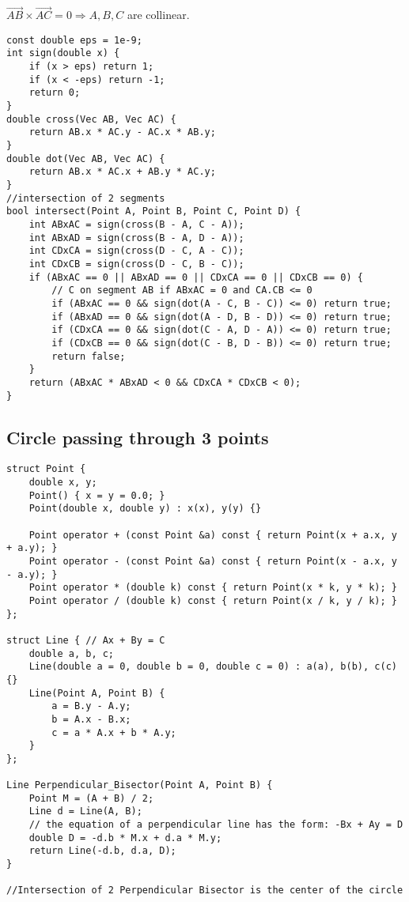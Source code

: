 \documentclass[11pt,a4paper]{article}
\begin{document}
\begin{multicols*}{2}
$\vec{AB} \times \vec{AC} = 0 \Rightarrow  A, B, C$ are collinear.

\begin{lstlisting}
const double eps = 1e-9;
int sign(double x) {
    if (x > eps) return 1;
    if (x < -eps) return -1;
    return 0;
}
double cross(Vec AB, Vec AC) {
    return AB.x * AC.y - AC.x * AB.y;
}
double dot(Vec AB, Vec AC) {
    return AB.x * AC.x + AB.y * AC.y;
}
//intersection of 2 segments
bool intersect(Point A, Point B, Point C, Point D) {
    int ABxAC = sign(cross(B - A, C - A));
    int ABxAD = sign(cross(B - A, D - A));
    int CDxCA = sign(cross(D - C, A - C));
    int CDxCB = sign(cross(D - C, B - C));
    if (ABxAC == 0 || ABxAD == 0 || CDxCA == 0 || CDxCB == 0) {
        // C on segment AB if ABxAC = 0 and CA.CB <= 0
        if (ABxAC == 0 && sign(dot(A - C, B - C)) <= 0) return true;
        if (ABxAD == 0 && sign(dot(A - D, B - D)) <= 0) return true;
        if (CDxCA == 0 && sign(dot(C - A, D - A)) <= 0) return true;
        if (CDxCB == 0 && sign(dot(C - B, D - B)) <= 0) return true;
        return false;
    }
    return (ABxAC * ABxAD < 0 && CDxCA * CDxCB < 0);
}
\end{lstlisting}

\subsection{Circle passing through 3 points}
\begin{lstlisting}
struct Point {
    double x, y;
    Point() { x = y = 0.0; }
    Point(double x, double y) : x(x), y(y) {}

    Point operator + (const Point &a) const { return Point(x + a.x, y + a.y); }
    Point operator - (const Point &a) const { return Point(x - a.x, y - a.y); }
    Point operator * (double k) const { return Point(x * k, y * k); }
    Point operator / (double k) const { return Point(x / k, y / k); }
};

struct Line { // Ax + By = C
    double a, b, c;
    Line(double a = 0, double b = 0, double c = 0) : a(a), b(b), c(c) {}
    Line(Point A, Point B) {
        a = B.y - A.y;
        b = A.x - B.x;
        c = a * A.x + b * A.y;
    }
};

Line Perpendicular_Bisector(Point A, Point B) {
    Point M = (A + B) / 2;
    Line d = Line(A, B);
    // the equation of a perpendicular line has the form: -Bx + Ay = D
    double D = -d.b * M.x + d.a * M.y;
    return Line(-d.b, d.a, D);
}

//Intersection of 2 Perpendicular Bisector is the center of the circle
\end{lstlisting}


\end{multicols*}
\end{document}
